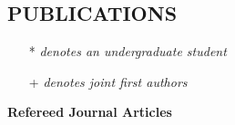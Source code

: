 \documentclass[margin]{res}
\newcommand{\annotate}[1]{\textcolor{black}{\textbf{(#1)}}}
\begin{document}
\begin{resume}


				


\section{PUBLICATIONS} 

\begin{itemize}
\item[*] \textit{denotes an undergraduate student}
\item[+] \textit{denotes joint first authors }
\end{itemize}


\textbf{Refereed Journal Articles}


\end{resume}
\end{document}
